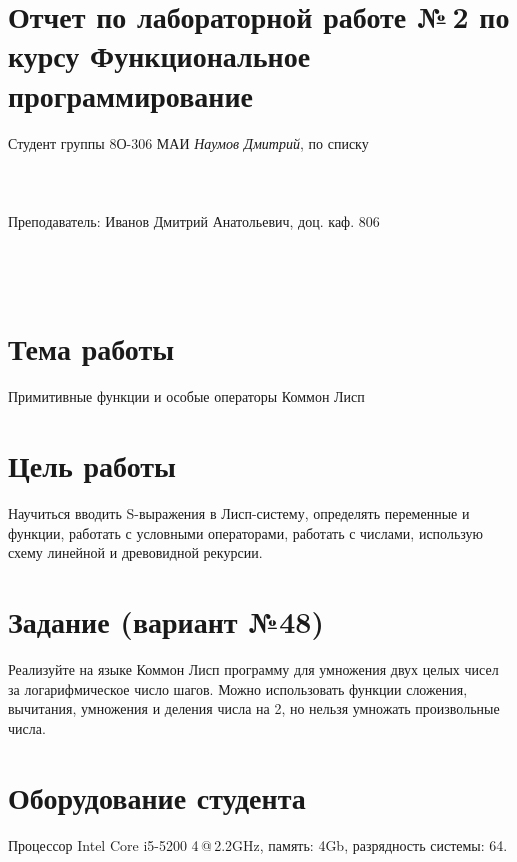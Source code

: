 \documentclass[12pt]{article}
\begin{document}
\section*{Отчет по лабораторной работе №\,2 
по курсу \guillemotleft  Функциональное программирование\guillemotright}
\begin{flushright}
Студент группы 8О-306 МАИ \textit{Наумов Дмитрий},  по списку \\
 \\
 \\
\ \\
Преподаватель: Иванов Дмитрий Анатольевич, доц. каф. 806 \\
 \\
 \\
 \\

\end{flushright}

\section{Тема работы}
Примитивные функции и особые операторы Коммон Лисп

\section{Цель работы}
Научиться вводить S-выражения в Лисп-систему, определять переменные и функции, работать с условными операторами, работать с числами, использую схему линейной и древовидной рекурсии.

\section{Задание (вариант №48)}
Реализуйте на языке Коммон Лисп программу для умножения двух целых чисел за логарифмическое число шагов. Можно использовать функции сложения, вычитания, умножения и деления числа на 2, но нельзя умножать произвольные числа.

\section{Оборудование студента}
Процессор Intel Core i5-5200 4\,@\,2.2GHz, память: 4Gb, разрядность системы: 64.
\end{document}
